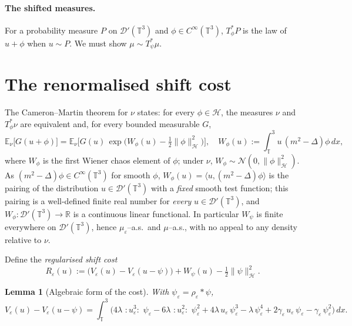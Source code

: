 \documentclass[12pt]{article}
\newtheorem{lemma}{Lemma}
\theoremstyle{definition}
\newcommand{\T}{\mathbb{T}^3}
\newcommand{\R}{\mathbb{R}}
\newcommand{\E}{\mathbb{E}}
\newcommand{\D}{\mathcal{D}'(\T)}
\newcommand{\Wick}[1]{\,{:}#1{:}\,}
\begin{document}
\paragraph{The shifted measures.}
For a probability measure $P$ on $\D$ and $\phi\in C^\infty(\T)$, $T_\phi^{*}P$ is the law
of $u+\phi$ when $u\sim P$. We must show $\mu\sim T_\psi^{*}\mu$.

\section{The renormalised shift cost}

The Cameron--Martin theorem for $\nu$ states: for every $\phi\in\mathcal H$, the measures
$\nu$ and $T_\phi^{*}\nu$ are equivalent and, for every bounded measurable $G$,
\begin{equation}\label{eq:CM}
  \E_\nu\!\big[G(u+\phi)\big]
  =\E_\nu\!\Big[G(u)\,\exp\!\big(W_\phi(u)-\tfrac12\|\phi\|_{\mathcal H}^2\big)\Big],
  \quad
  W_\phi(u):=\int_\T u\,(m^2-\Delta)\phi\,dx ,
\end{equation}
where $W_\phi$ is the first Wiener chaos element of $\phi$; under $\nu$,
$W_\phi\sim\mathcal N(0,\|\phi\|_{\mathcal H}^2)$. As $(m^2-\Delta)\phi\in C^\infty(\T)$
for smooth $\phi$, $W_\phi(u)=\langle u,(m^2-\Delta)\phi\rangle$ is the pairing of the
distribution $u\in\D$ with a \emph{fixed} smooth test function; this pairing is a
well-defined finite real number for \emph{every} $u\in\D$, and $W_\phi\colon\D\to\R$ is a
continuous linear functional. In particular $W_\psi$ is finite everywhere on $\D$, hence
$\mu_\varepsilon$--a.s.\ and $\mu$--a.s., with no appeal to any density relative to $\nu$.

Define the \emph{regularised shift cost}
\begin{equation}\label{eq:Reps}
  R_\varepsilon(u):=\big(V_\varepsilon(u)-V_\varepsilon(u-\psi)\big)+W_\psi(u)-\tfrac12\|\psi\|_{\mathcal H}^2 .
\end{equation}

\begin{lemma}[Algebraic form of the cost]\label{lem:algebra}
With $\psi_\varepsilon=\rho_\varepsilon*\psi$,
\begin{equation}\label{eq:cost-expanded}
  V_\varepsilon(u)-V_\varepsilon(u-\psi)
  =\int_\T\Big(
    4\lambda\,\Wick{u_\varepsilon^3}\,\psi_\varepsilon
    -6\lambda\,\Wick{u_\varepsilon^2}\,\psi_\varepsilon^2
    +4\lambda\,u_\varepsilon\,\psi_\varepsilon^3
    -\lambda\,\psi_\varepsilon^4
    +2\gamma_\varepsilon\,u_\varepsilon\,\psi_\varepsilon
    -\gamma_\varepsilon\,\psi_\varepsilon^2
  \Big)\,dx .
\end{equation}
\end{lemma}
\end{document}
